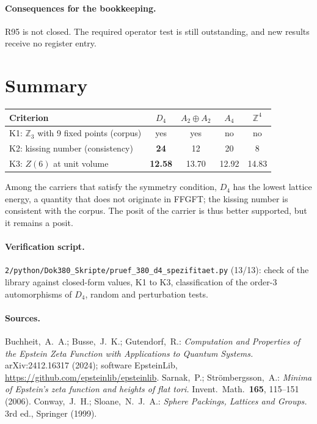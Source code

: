 \paragraph{Consequences for the bookkeeping.}
R95 is not closed. The required operator test is still outstanding, and new
results receive no register entry.

\section{Summary}

\begin{center}
\begin{tabular}{>{\raggedright\arraybackslash}p{3.2cm}cccc}
\toprule
Criterion & $D_4$ & $A_2\oplus A_2$ & $A_4$ & $\mathbb{Z}^4$ \\
\midrule
K1: $\mathbb{Z}_3$ with 9 fixed points (corpus) & yes & yes & no & no \\
K2: kissing number (consistency) & \textbf{24} & 12 & 20 & 8 \\
K3: $Z(6)$ at unit volume & \textbf{12.58} & 13.70 & 12.92 & 14.83 \\
\bottomrule
\end{tabular}
\end{center}

Among the carriers that satisfy the symmetry condition, $D_4$ has the lowest
lattice energy, a quantity that does not originate in FFGFT; the kissing
number is consistent with the corpus. The posit of the carrier is thus better
supported, but it remains a posit.

\paragraph{Verification script.} \texttt{2/python/Dok380\_Skripte/pruef\_380\_d4\_spezifitaet.py}
(13/13): check of the library against closed-form values, K1 to K3,
classification of the order-3 automorphisms of $D_4$, random and perturbation
tests.

\paragraph{Sources.}
Buchheit,~A.~A.; Busse,~J.~K.; Gutendorf,~R.: \textit{Computation and
Properties of the Epstein Zeta Function with Applications to Quantum
Systems.} arXiv:2412.16317 (2024); software EpsteinLib,
\url{https://github.com/epsteinlib/epsteinlib}.
Sarnak,~P.; Strömbergsson,~A.: \textit{Minima of Epstein's zeta function and
heights of flat tori.} Invent.\ Math.\ \textbf{165}, 115--151 (2006).
Conway,~J.~H.; Sloane,~N.~J.~A.: \textit{Sphere Packings, Lattices and
Groups.} 3rd ed., Springer (1999).
